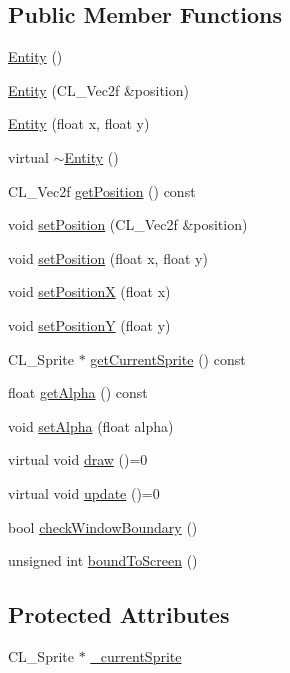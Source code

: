 \subsection*{Public Member Functions}
\begin{DoxyCompactItemize}
\item 
\hyperlink{class_entity_a980f368aa07ce358583982821533a54a}{Entity} ()
\item 
\hyperlink{class_entity_aec213f431f76b0d62c95c3a1bcbdc42b}{Entity} (CL\_\-Vec2f \&position)
\item 
\hyperlink{class_entity_ae5a9ed9b94b78f5f89b177a611689e5f}{Entity} (float x, float y)
\item 
virtual \hyperlink{class_entity_adf6d3f7cb1b2ba029b6b048a395cc8ae}{$\sim$Entity} ()
\item 
CL\_\-Vec2f \hyperlink{class_entity_ac474e0352dea30dfac812c10a792949c}{getPosition} () const 
\item 
void \hyperlink{class_entity_a6d7e2b94f0843532154866ff0d838167}{setPosition} (CL\_\-Vec2f \&position)
\item 
void \hyperlink{class_entity_a93306ecdce9446da37560f5f2b5307c0}{setPosition} (float x, float y)
\item 
void \hyperlink{class_entity_a4de8724a35a2035f18afca7d95f5bd3a}{setPositionX} (float x)
\item 
void \hyperlink{class_entity_afae7da405b8456d03fc8ddea62ce0898}{setPositionY} (float y)
\item 
CL\_\-Sprite $\ast$ \hyperlink{class_entity_a6eb1336884974ce38a2a5f2959e3f2c2}{getCurrentSprite} () const 
\item 
float \hyperlink{class_entity_a68e01997ca6ee8e9df7599ac629c9ce9}{getAlpha} () const 
\item 
void \hyperlink{class_entity_a93a379ff0b5eb9557831abe2674bdd46}{setAlpha} (float alpha)
\item 
virtual void \hyperlink{class_entity_a2e9a2986527958f0b0c43239efe9b270}{draw} ()=0
\item 
virtual void \hyperlink{class_entity_a59a29d9b7474baf13c9c76859242287d}{update} ()=0
\item 
bool \hyperlink{class_entity_a028c1bf9276905b5401de80ec88cfaa3}{checkWindowBoundary} ()
\item 
unsigned int \hyperlink{class_entity_aef338be6e4f5f4c95edd5ff91098cd84}{boundToScreen} ()
\end{DoxyCompactItemize}
\subsection*{Protected Attributes}
\begin{DoxyCompactItemize}
\item 
CL\_\-Sprite $\ast$ \hyperlink{class_entity_a7afb2848e246a8c39ca0d3503d97b51d}{\_\-currentSprite}
\end{DoxyCompactItemize}


